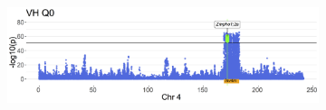\documentclass[10pt,letterpaper]{article}
\begin{document}
\begin{figure}[p] %

\centering

\begin{subfigure}[b]{\textwidth}
   \includegraphics[width=\linewidth]{fig6a.png}
   \caption{}
\end{subfigure} 


\end{figure}
\end{document}
